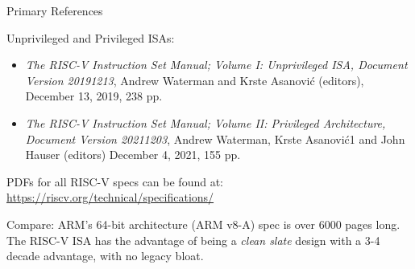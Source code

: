 \documentclass{article}
\newcommand{\hmmmm}{\hspace*{4em}}
\begin{document}
\clearpage


\begin{center}\LARGE
  {\Huge Primary References}

  \vspace{0.5in}

  \begin{minipage}{9in}
    Unprivileged and Privileged ISAs:

    \begin{itemize}
    \item \emph{The RISC-V Instruction Set Manual; Volume I:
    Unprivileged ISA, Document Version 20191213}, Andrew Waterman and
      Krste Asanović (editors), December 13, 2019, 238 pp.

    \item \emph{The RISC-V Instruction Set Manual; Volume II: Privileged Architecture,
    Document Version 20211203}, Andrew Waterman, Krste Asanović1 and John Hauser (editors)
      December 4, 2021, 155 pp.
    \end{itemize}

    \vspace{0.5in}

    PDFs for all RISC-V specs can be found at: \\
    \hmmmm \url{https://riscv.org/technical/specifications/}

    \vspace{1in}

    Compare: ARM’s 64-bit architecture (ARM v8-A) spec is over 6000
    pages long.  The RISC-V ISA has the advantage of being a
    \emph{clean slate} design with a 3-4 decade advantage, with no
    legacy bloat.

  \end{minipage}

\end{center}

\clearpage

\end{document}
